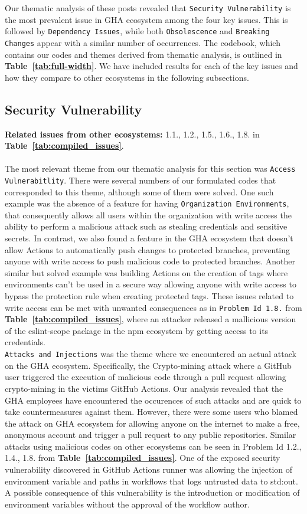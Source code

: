 \documentclass[conference]{IEEEtran}
\begin{document}
Our thematic analysis of these posts revealed that \texttt{Security Vulnerability} is the most prevalent issue in GHA ecosystem among the four key issues. This is followed by \texttt{Dependency Issues}, while both \texttt{Obsolescence} and \texttt{Breaking Changes} appear with a similar number of occurrences. The codebook, which contains our codes and themes derived from thematic analysis, is outlined in \textbf{Table~\ref{tab:full-width}}. We have included results for each of the key issues and how they compare to other ecosystems in the following subsections.
\subsection*{\textbf{Security Vulnerability}}
\textbf{Related issues from other ecosystems:} 1.1., 1.2., 1.5., 1.6., 1.8. in \textbf{Table~\ref{tab:compiled_issues}}.\\\\
The most relevant theme from our thematic analysis for this section was \texttt{Access Vulnerabitlity}. There were several numbers of our formulated codes that corresponded to this theme, although some of them were solved. One such example was the absence of a feature for having \texttt{Organization Environments}, that consequently allows all users within the organization with write access the ability to perform a malicious attack such as stealing credentials and sensitive secrets. In contrast, we also found a feature in the GHA ecosystem that doesn't allow Actions to automatically push changes to protected branches, preventing anyone with write access to push malicious code to protected branches. Another similar but solved example was building Actions on the creation of tags where environments can't be used in a secure way allowing anyone with write access to bypass the protection rule when creating protected tags.  These issues related to write access can be met with unwanted consequences as in \texttt{Problem Id 1.8.} from \textbf{Table~\ref{tab:compiled_issues}}, where an attacker released a mallicious version of the eslint-scope package in the npm ecosystem  by getting access to its credentials. \\
\texttt{Attacks and Injections} was the theme where we encountered an actual attack on the GHA ecosystem. Specifically, the Crypto-mining attack where a GitHub user triggered the execution of malicious code through a pull request allowing crypto-mining in the victims GitHub Actions. Our analysis revealed that the GHA employees have encountered the occurences of such attacks and are  quick to take countermeasures against them. However, there were some users who blamed the attack on GHA ecosystem for allowing anyone on the internet to make a free, anonymous account and trigger a pull request to any public repositories. Similar attacks using malicious codes on other ecosystems can be seen in Problem Id 1.2., 1.4., 1.8. from \textbf{Table~\ref{tab:compiled_issues}}. One of the exposed security vulnerability discovered in GitHub Actions runner was allowing the injection of environment variable and paths in workflows that logs untrusted data to std:out. A possible consequence of this vulnerability is the introduction or modification of environment variables without the approval of the workflow author.
\end{document}
